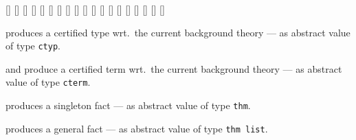 \begin{isabellebody}
\begin{isamarkuptext}
  \begin{railoutput}
[]
[]
\rail@end
{}
[]
[]
\rail@end
{}
[]
[]
\rail@end
{}
[]
[]
\rail@end
{}
[]
[]
\rail@end
{}
[]
\rail@bar
{}
[]
[]
[]
\rail@endbar
\rail@plus
\rail@plus
{}[]
\rail@endplus
{}
[]
\rail@endplus
{}
[]
[]
\rail@bar
{}
[]
\rail@endbar
\rail@end
\end{railoutput}


  \begin{description}

  \item {} produces a certified type wrt.\ the
  current background theory --- as abstract value of type \verb|ctyp|.

  \item {} and  produce a
  certified term wrt.\ the current background theory --- as abstract
  value of type \verb|cterm|.

  \item {} produces a singleton fact --- as abstract
  value of type \verb|thm|.

  \item {} produces a general fact --- as abstract
  value of type \verb|thm list|.


\end{description}
\end{isamarkuptext}
\end{isabellebody}
